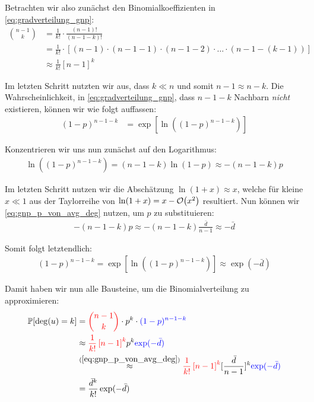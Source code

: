 \medskip

Betrachten wir also zunächst den Binomialkoeffizienten in \cref{eq:gradverteilung_gnp}:
\begin{align}
    \binom{n-1}{k}
     & = \frac{1}{k!} \cdot \frac{(n-1)!}{(n-1-k)!}                                                              \\
     & = \frac{1}{k!} \cdot \left[ (n-1) \cdot (n-1-1) \cdot (n-1-2) \cdot \ldots \cdot (n-1-(k - 1))    \right] \\
     & \approx \frac{1}{k!} \left[ n- 1 \right]^k
\end{align}

Im letzten Schritt nutzten wir aus, dass $k \ll n$ und somit $n-1 \approx n-k$.
Die Wahrscheinlichkeit, in \cref{eq:gradverteilung_gnp}, dass $n-1-k$ Nachbarn \emph{nicht} existieren, können wir wie folgt auffassen:
\begin{align}
    (1 - p)^{n-1-k} & = \exp\left[ \ln\left((1 - p)^{n-1-k}  \right) \right]
\end{align}

\noindent
Konzentrieren wir uns nun zunächst auf den Logarithmus:
\begin{align}
    \ln\left((1 - p)^{n-1-k}  \right)  =
    (n-1-k) \ln (1 - p)
    \approx - (n-1-k) p
\end{align}

\noindent
Im letzten Schritt nutzen wir die Abschätzung $\ln(1+x) \approx x$, welche für kleine $x \ll 1$ aus der Taylorreihe von $\ln(1+x) = x - \mathcal{O}\!\left(x^2\right)$ resultiert.
Nun können wir \cref{eq:gnp_p_von_avg_deg} nutzen, um $p$ zu substituieren:
\begin{align}
    - (n-1-k) p \approx - (n-1-k) \frac{\bar d}{n-1} \approx - \bar d
\end{align}

\noindent
Somit folgt letztendlich:
\begin{align}
    (1 - p)^{n-1-k} = \exp\left[ \ln\left((1 - p)^{n-1-k}  \right) \right] \approx \exp(-\bar d)
\end{align}

\noindent
Damit haben wir nun alle Bausteine, um die Binomialverteilung zu approximieren:
\begin{align}
    \mathbb{P}\!\left[\deg(u) = k\right]
     & = \textcolor{red}{\binom{n-1}{k}} \cdot p^k \cdot \textcolor{blue}{(1-p)^{n-1-k}}                       \\
     & \approx \textcolor{red}{\frac{1}{k!} \left[ n- 1 \right]^k} p^k \textcolor{blue}{\exp(-\bar d)}         \\
     & \stackrel{(\ref{eq:gnp_p_von_avg_deg})}{\approx}
    \textcolor{red}{\frac{1}{k!} \left[ n- 1 \right]^k} [\frac{\bar d}{n-1}]^k \textcolor{blue}{\exp(-\bar d)} \\
     & = \frac{\bar d^k}{k!} \exp(-\bar d)
\end{align}

